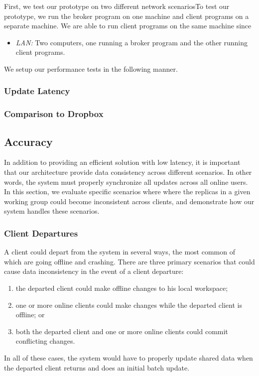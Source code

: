 First, we test our prototype on two different network scenariosTo test our prototype, we run the broker program on one
machine and client programs on a separate machine.
We are able to run client programs on the same machine
since 
\begin{itemize}
\item \emph{LAN:} Two computers, one running a broker program and the other
running client programs.
\end{itemize}

We setup our performance tests in the following manner.


\subsubsection{Update Latency}

\subsubsection{Comparison to Dropbox}

\subsection{Accuracy}
\label{evaluation.accuracy}
In addition to providing an efficient solution with low latency,
it is important that our architecture provide data consistency across different
scenarios.
In other words, the system must properly synchronize
all updates across all online users.
In this section, we evaluate specific scenarios where
where the replicas in a given working group could become inconsistent across clients,
and demonstrate how our system handles these scenarios.

\subsubsection{Client Departures}
A client could depart from the system in several ways,
the most common of which are going offline and crashing.
There are three primary scenarios that could cause
data inconsistency in the event of a client departure:
\begin{enumerate}[(1)]
\item the departed client could make offline changes to his local workspace;
\item one or more online clients could make changes while the departed client is offline; or
\item both the departed client and one or more online clients could commit conflicting changes.
\end{enumerate}
In all of these cases, the system would have to properly update shared data
when the departed client returns and does an initial batch update.

